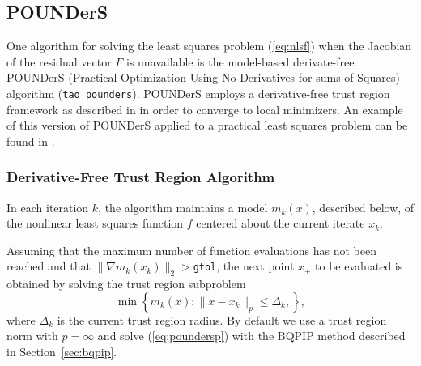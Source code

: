 \begin{comment}
Most solvers also require the Jacobian of this function.  
The routine that evaluates this matrix should be set
using the command {\tt Tao\-Set\-Jacobian\-Routine()}.

Using the constraint data provided by the user, the nonlinear
least squares solver formulates a minimization problem, and
solves the minimization problem using another TAO solver.  
A nonlinear least squares application should be solved with
the method \texttt{tao\_pounders} or \texttt{tao\_lm}.
\textbf{***** Jason, check the lm above. It would be great to include it
but otherwise say that we only have methods that do not use the Jacobian
and that if they have a Jacobian, they should use something else/the
next/beta version.}
\end{comment}

\subsection{POUNDerS}\label{sec:pounders}
   One algorithm for solving the least squares problem (\ref{eq:nlsf}) when
the Jacobian
of the residual vector $F$ is unavailable is the model-based
derivate-free POUNDerS (Practical Optimization Using No Derivatives for
sums of Squares) algorithm (\texttt{tao\_pounders}). 
POUNDerS employs a derivative-free trust region framework as described in
\cite{Dfobook} in order to converge to local minimizers. An example of
this version of POUNDerS applied to a
practical least squares problem can be found in \cite{UNEDF0}.



\subsubsection{Derivative-Free Trust Region Algorithm}
In each iteration $k$, the algorithm maintains a model $m_k(x)$,
described below, of the nonlinear least squares function $f$ centered about
the current iterate $x_k$. 

Assuming that the maximum number of function evaluations has not been
reached and that $\|\nabla m_k(x_k)\|_2>$\texttt{gtol}, the next point 
$x_+$ to be evaluated is obtained by solving the trust region subproblem 
\begin{equation}
 \min\left\{
 m_k(x) : 
 \|x-x_k\|_{p} \leq \Delta_k, 
 \right \}, 
 \label{eq:poundersp}
\end{equation}
where $\Delta_k$ is the current 
trust region radius. By default we use a trust region norm with $p=\infty$
and solve (\ref{eq:poundersp}) with the BQPIP method described in
Section~\ref{sec:bqpip}. 

